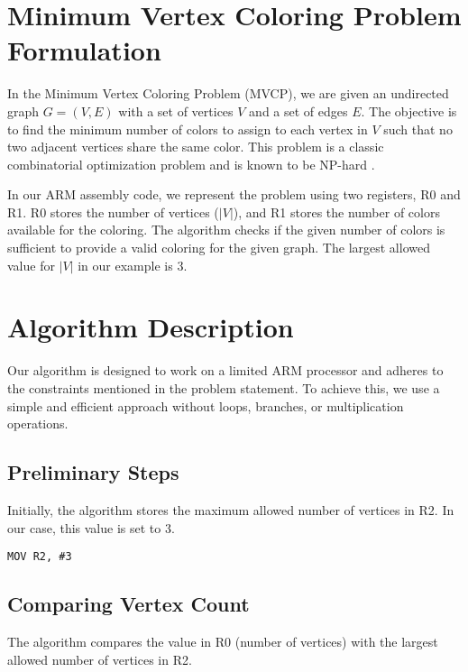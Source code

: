 
\section{Minimum Vertex Coloring Problem Formulation}

In the Minimum Vertex Coloring Problem (MVCP), we are given an undirected graph $G = (V, E)$ with a set of vertices $V$ and a set of edges $E$. The objective is to find the minimum number of colors to assign to each vertex in $V$ such that no two adjacent vertices share the same color. This problem is a classic combinatorial optimization problem and is known to be NP-hard \cite{garey1979computers}. 

In our ARM assembly code, we represent the problem using two registers, R0 and R1. R0 stores the number of vertices ($|V|$), and R1 stores the number of colors available for the coloring. The algorithm checks if the given number of colors is sufficient to provide a valid coloring for the given graph. The largest allowed value for $|V|$ in our example is 3.

\section{Algorithm Description}

Our algorithm is designed to work on a limited ARM processor and adheres to the constraints mentioned in the problem statement. To achieve this, we use a simple and efficient approach without loops, branches, or multiplication operations.

\subsection{Preliminary Steps}

Initially, the algorithm stores the maximum allowed number of vertices in R2. In our case, this value is set to 3.

\begin{verbatim}
MOV R2, #3
\end{verbatim}

\subsection{Comparing Vertex Count}

The algorithm compares the value in R0 (number of vertices) with the largest allowed number of vertices in R2.

